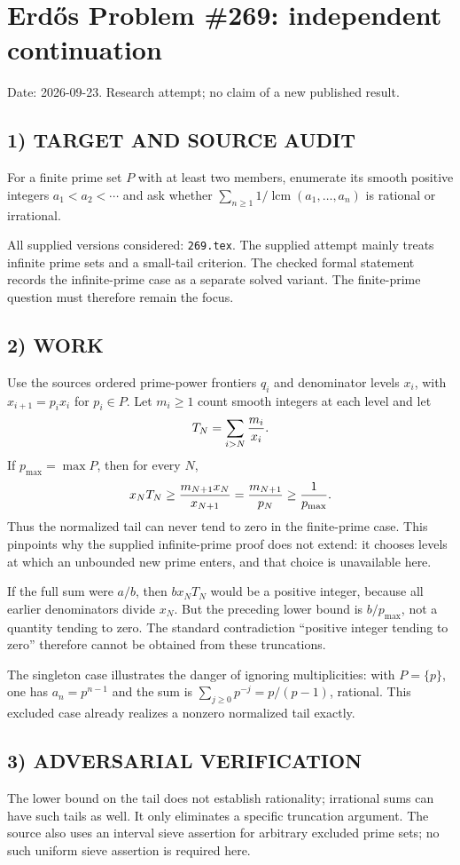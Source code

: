 \section{Erd\H{o}s Problem \#269: independent continuation}
\noindent Date: 2026-09-23. Research attempt; no claim of a new published result.
\subsection{1) TARGET AND SOURCE AUDIT}
For a finite prime set $P$ with at least two members, enumerate its smooth positive integers $a_1<a_2<\cdots$ and ask whether $\sum_{n\ge1}1/\operatorname{lcm}(a_1,\ldots,a_n)$ is rational or irrational.

All supplied versions considered: \texttt{269.tex}.
The supplied attempt mainly treats infinite prime sets and a small-tail criterion. The checked formal statement records the infinite-prime case as a separate solved variant. The finite-prime question must therefore remain the focus.
\subsection{2) WORK}
Use the source\textquotesingle s ordered prime-power frontiers $q_i$ and denominator levels $x_i$, with $x_{i+1}=p_i x_i$ for $p_i\in P$. Let $m_i\ge1$ count smooth integers at each level and let
\[
T_N=\sum_{i>N}{m_i\over x_i}.
\]
If $p_{\max}=\max P$, then for every $N$,
\[
x_NT_N\ge {m_{N+1}x_N\over x_{N+1}}={m_{N+1}\over p_N}\ge{1\over p_{\max}}.
\]
Thus the normalized tail can never tend to zero in the finite-prime case. This pinpoints why the supplied infinite-prime proof does not extend: it chooses levels at which an unbounded new prime enters, and that choice is unavailable here.

If the full sum were $a/b$, then $b x_N T_N$ would be a positive integer, because all earlier denominators divide $x_N$. But the preceding lower bound is $b/p_{\max}$, not a quantity tending to zero. The standard contradiction ``positive integer tending to zero'' therefore cannot be obtained from these truncations.

The singleton case illustrates the danger of ignoring multiplicities: with $P=\{p\}$, one has $a_n=p^{n-1}$ and the sum is $\sum_{j\ge0}p^{-j}=p/(p-1)$, rational. This excluded case already realizes a nonzero normalized tail exactly.
\subsection{3) ADVERSARIAL VERIFICATION}
The lower bound on the tail does not establish rationality; irrational sums can have such tails as well. It only eliminates a specific truncation argument. The source also uses an interval sieve assertion for arbitrary excluded prime sets; no such uniform sieve assertion is required here.
